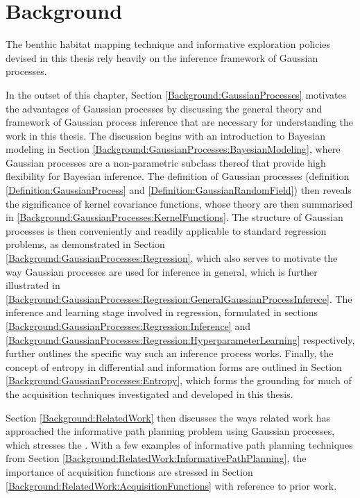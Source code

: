\chapter{Background}
\label{Background}

	The benthic habitat mapping technique and informative exploration policies devised in this thesis rely heavily on the inference framework of Gaussian processes. 
	
	In the outset of this chapter, Section \ref{Background:GaussianProcesses} motivates the advantages of Gaussian processes by discussing the general theory and framework of Gaussian process inference that are necessary for understanding the work in this thesis. The discussion begins with an introduction to Bayesian modeling in Section \ref{Background:GaussianProcesses:BayesianModeling}, where Gaussian processes are a non-parametric subclass thereof that provide high flexibility for Bayesian inference. The definition of Gaussian processes (definition \ref{Definition:GaussianProcess} and \ref{Definition:GaussianRandomField}) then reveals the significance of kernel covariance functions, whose theory are then summarised in \ref{Background:GaussianProcesses:KernelFunctions}. The structure of Gaussian processes is then conveniently and readily applicable to standard regression problems, as demonstrated in Section \ref{Background:GaussianProcesses:Regression}, which also serves to motivate the way Gaussian processes are used for inference in general, which is further illustrated in \ref{Background:GaussianProcesses:Regression:GeneralGaussianProcessInferece}. The inference and learning stage involved in regression, formulated in sections \ref{Background:GaussianProcesses:Regression:Inference} and \ref{Background:GaussianProcesses:Regression:HyperparameterLearning} respectively, further outlines the specific way such an inference process works. Finally, the concept of entropy in differential and information forms are outlined in Section \ref{Background:GaussianProcesses:Entropy}, which forms the grounding for much of the acquisition techniques investigated and developed in this thesis.
	
	
	Section \ref{Background:RelatedWork} then discusses the ways related work has approached the informative path planning problem using Gaussian processes, which stresses the . With a few examples of informative path planning techniques from Section \ref{Background:RelatedWork:InformativePathPlanning}, the importance of acquisition functions are stressed in Section \ref{Background:RelatedWork:AcquisitionFunctions} with reference to prior work.
	
